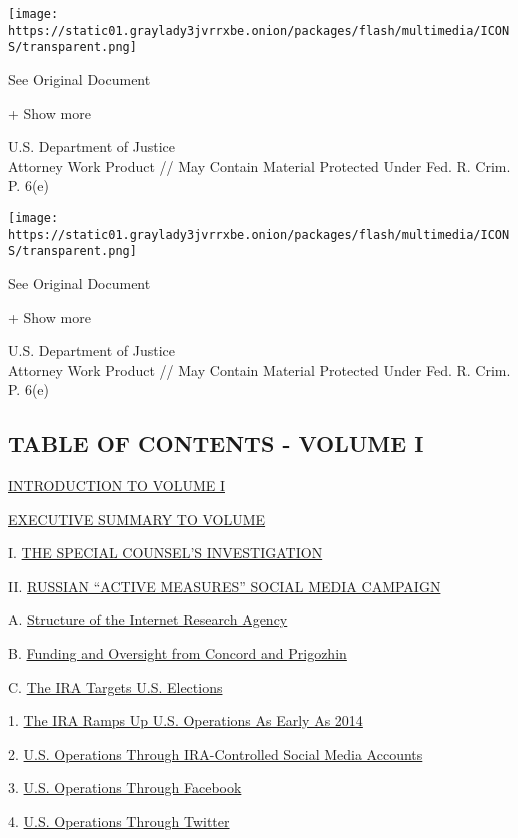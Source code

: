 \protect\hyperlink{}{}

\texttt{[image: https://static01.graylady3jvrrxbe.onion/packages/flash/multimedia/ICONS/transparent.png]}

See Original Document

+ Show more

U.S. Department of Justice\\
Attorney Work Product // May Contain Material Protected Under Fed. R.
Crim. P. 6(e)

\protect\hyperlink{}{}

\texttt{[image: https://static01.graylady3jvrrxbe.onion/packages/flash/multimedia/ICONS/transparent.png]}

See Original Document

+ Show more

U.S. Department of Justice\\
Attorney Work Product // May Contain Material Protected Under Fed. R.
Crim. P. 6(e)

\hypertarget{table-of-contents---volume-i}{%
\subsection{TABLE OF CONTENTS - VOLUME
I}\label{table-of-contents---volume-i}}

\protect\hyperlink{g-page-9}{INTRODUCTION TO VOLUME I}

\protect\hyperlink{g-page-12}{EXECUTIVE SUMMARY TO VOLUME}

I. \protect\hyperlink{g-page-19}{THE SPECIAL COUNSEL'S INVESTIGATION}

II. \protect\hyperlink{g-page-22}{RUSSIAN ``ACTIVE MEASURES'' SOCIAL
MEDIA CAMPAIGN}

A. \protect\hyperlink{g-page-23}{Structure of the Internet Research
Agency}

B. \protect\hyperlink{g-page-24}{Funding and Oversight from Concord and
Prigozhin}

C. \protect\hyperlink{g-page-27}{The IRA Targets U.S. Elections}

1. \protect\hyperlink{g-page-27}{The IRA Ramps Up U.S. Operations As
Early As 2014}

2. \protect\hyperlink{g-page-30}{U.S. Operations Through IRA-Controlled
Social Media Accounts}

3. \protect\hyperlink{g-page-32}{U.S. Operations Through Facebook}

4. \protect\hyperlink{g-page-34}{U.S. Operations Through Twitter}


